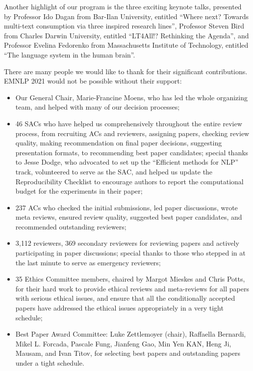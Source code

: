 Another highlight of our program is the three exciting keynote talks, presented by Professor Ido Dagan from Bar-Ilan University, entitled ``Where next? Towards multi-text consumption via three inspired research lines'', Professor Steven Bird from Charles Darwin University, entitled ``LT4All!? Rethinking the Agenda'', and Professor Evelina Fedorenko from Massachusetts Institute of Technology, entitled ``The language system in the human brain''.

There are many people we would like to thank for their significant contributions. EMNLP 2021 would not be possible without their support:

\begin{itemize}

\item Our General Chair, Marie-Francine Moens, who has led the whole organizing team, and helped with many of our decision processes;
\item 46 SACs who have helped us comprehensively throughout the entire review process, from recruiting ACs and reviewers, assigning papers, checking review quality, making recommendation on final paper decisions, suggesting presentation formats, to recommending best paper candidates; special thanks to Jesse Dodge, who advocated to set up the ``Efficient methods for NLP'' track, volunteered to serve as the SAC, and helped us update the Reproducibility Checklist to encourage authors to report the computational budget for the experiments in their paper;
\item 237 ACs who checked the initial submissions, led paper discussions, wrote meta reviews, ensured review quality, suggested best paper candidates, and recommended outstanding reviewers;
\item 3,112 reviewers, 369 secondary reviewers for reviewing papers and actively participating in paper discussions; special thanks to those who stepped in at the last minute to serve as emergency reviewers;
\item 35 Ethics Committee members, chaired by Margot Mieskes and Chris Potts, for their hard work to provide ethical reviews and meta-reviews for all papers with serious ethical issues, and ensure that all the conditionally accepted papers have addressed the ethical issues appropriately in a very tight schedule;
\item Best Paper Award Committee: Luke Zettlemoyer (chair), Raffaella Bernardi, Mikel L. Forcada, Pascale Fung, Jianfeng Gao, Min Yen KAN, Heng Ji, Mausam, and Ivan Titov, for selecting best papers and outstanding papers under a tight schedule.

\end{itemize}

